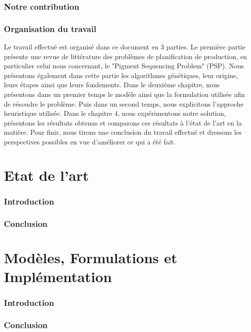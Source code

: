 \documentclass[12pt,a4paper]{article}
\begin{document}
	\section*{Notre contribution}
	
	\section*{Organisation du travail}

	Le travail effectué est organisé dans ce document en 3 parties. Le première partie présente une revue de littérature des problèmes de planification de production, en particulier celui nous concernant, le "Pigment Sequencing Problem" (PSP). Nous présentons également dans cette partie les algorithmes génétiques, leur origine, leurs étapes ainsi que leurs fondements. Dans le deuxième chapitre, nous présentons dans un premier temps le modèle ainsi que la formulation utilisée afin de résoudre le problème. Puis dans un second temps, nous explicitons l'approche heuristique utilisée. Dans le chapitre 4, nous expérimentons  notre solution, présentons les résultats obtenus et comparons ces résultats à l'état de l'art en la matière. Pour finir, nous tirons une conclusion du travail effectué et dressons les perspectives possibles en vue d'améliorer ce qui a été fait.
	
	\newpage
	
	\part{Etat de l'art}
		\section*{Introduction}
		\section*{Conclusion}
		
	\newpage
	
	\part{Modèles, Formulations et Implémentation}
		\section*{Introduction}
		\section*{Conclusion}
		
\end{document}
